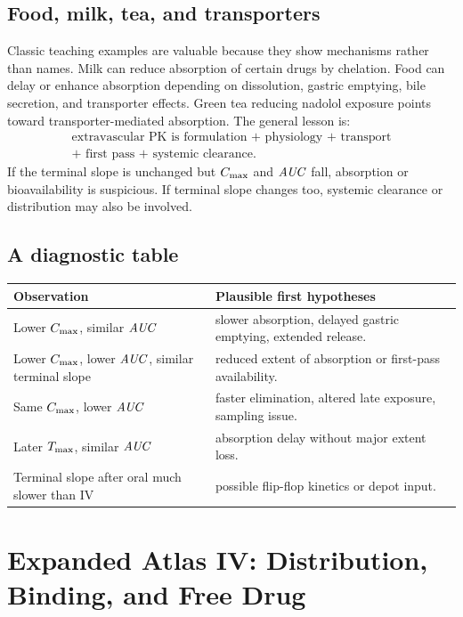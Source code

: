 \subsection{Food, milk, tea, and transporters}

Classic teaching examples are valuable because they show mechanisms rather than names. Milk can reduce absorption of certain drugs by chelation. Food can delay or enhance absorption depending on dissolution, gastric emptying, bile secretion, and transporter effects. Green tea reducing nadolol exposure points toward transporter-mediated absorption. The general lesson is:
\[
  \begin{gathered}
  \text{extravascular PK is formulation + physiology + transport}\\
  \text{+ first pass + systemic clearance}.
  \end{gathered}
\]
If the terminal slope is unchanged but \(C_{\max}\) and \(\pkAUC\) fall, absorption or bioavailability is suspicious. If terminal slope changes too, systemic clearance or distribution may also be involved.

\subsection{A diagnostic table}

\begin{center}
\begin{tabularx}{0.96\textwidth}{@{}lX@{}}
\toprule
Observation & Plausible first hypotheses \\
\midrule
Lower \(C_{\max}\), similar \(\pkAUC\) & slower absorption, delayed gastric emptying, extended release. \\
Lower \(C_{\max}\), lower \(\pkAUC\), similar terminal slope & reduced extent of absorption or first-pass availability. \\
Same \(C_{\max}\), lower \(\pkAUC\) & faster elimination, altered late exposure, sampling issue. \\
Later \(T_{\max}\), similar \(\pkAUC\) & absorption delay without major extent loss. \\
Terminal slope after oral much slower than IV & possible flip-flop kinetics or depot input. \\
\bottomrule
\end{tabularx}
\end{center}

\section{Expanded Atlas IV: Distribution, Binding, and Free Drug}

